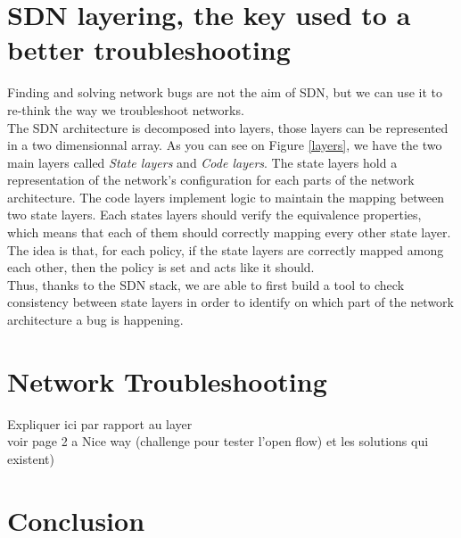 \documentclass[10pt,article]{IEEEtran}
\begin{document}
\section{SDN layering, the key used to a better troubleshooting}
Finding and solving network bugs are not the aim of SDN, but we can use it to re-think the way we troubleshoot networks.\\ The SDN architecture is decomposed into  layers, those layers can be represented in a two dimensionnal array. As you can see on Figure \ref{layers}, we have the two main layers called \textit{State layers} and \textit{Code layers}. The state layers hold a representation of the network's configuration for each parts of the network architecture. The code layers implement logic to maintain the mapping between two state layers. Each states layers should verify the equivalence properties, which means that each of them should correctly mapping every other state layer. The idea is that, for each policy, if the state layers are correctly mapped among each other, then the policy is  set and acts like it should.\\
Thus, thanks to the SDN stack, we are able to first build a tool to check consistency between state layers in order to identify on which part of the network architecture a bug is happening.

\section{Network Troubleshooting}
Expliquer ici par rapport au layer\\
voir page 2 a Nice way (challenge pour tester l'open flow) et les solutions qui existent)

\section{}

\section{Conclusion}


\nocite{*}


\end{document}
